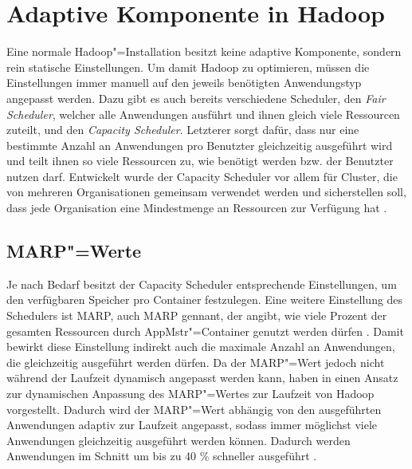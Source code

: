 \section{Adaptive Komponente in Hadoop}\label{sec:inriaSetting}

Eine normale Hadoop"=Installation besitzt keine adaptive Komponente, sondern rein statische Einstellungen.
Um damit Hadoop zu optimieren, müssen die Einstellungen immer manuell auf den jeweils benötigten Anwendungstyp angepasst werden.
Dazu gibt es auch bereits verschiedene Scheduler, den \emph{Fair Scheduler}, welcher alle Anwendungen ausführt und ihnen gleich viele Ressourcen zuteilt, und den \emph{Capacity Scheduler}.
Letzterer sorgt dafür, dass nur eine bestimmte Anzahl an Anwendungen pro Benutzter gleichzeitig ausgeführt wird und teilt ihnen so viele Ressourcen zu, wie benötigt werden bzw. der Benutzter nutzen darf.
Entwickelt wurde der Capacity Scheduler vor allem für Cluster, die von mehreren Organisationen gemeinsam verwendet werden und sicherstellen soll, dass jede Organisation eine Mindestmenge an Ressourcen zur Verfügung hat \cite{HadoopCapScheduler271}.

\subsection{MARP"=Werte}\label{sec:selfbalancingMarp}

Je nach Bedarf besitzt der Capacity Scheduler entsprechende Einstellungen, um \zB den verfügbaren Speicher pro Container festzulegen.
Eine weitere Einstellung des Schedulers ist \acl{MARP}, auch \acs{MARP} gennant, der angibt, wie viele Prozent der gesamten Ressourcen durch \ac{AppMstr}"=Container genutzt werden dürfen \cite{HadoopCapScheduler271}.
Damit bewirkt diese Einstellung indirekt auch die maximale Anzahl an Anwendungen, die gleichzeitig ausgeführt werden dürfen.
Da der \ac{MARP}"=Wert jedoch nicht während der Laufzeit dynamisch angepasst werden kann, haben \citeauthor{zhang2016} in \cite{zhang2016} einen Ansatz zur dynamischen Anpassung des \ac{MARP}"=Wertes zur Laufzeit von Hadoop vorgestellt.
Dadurch wird der \ac{MARP}"=Wert abhängig von den ausgeführten Anwendungen adaptiv zur Laufzeit angepasst, sodass immer möglichst viele Anwendungen gleichzeitig ausgeführt werden können.
Dadurch werden Anwendungen im Schnitt um bis zu 40 \% schneller ausgeführt \cite{zhang2016}.

